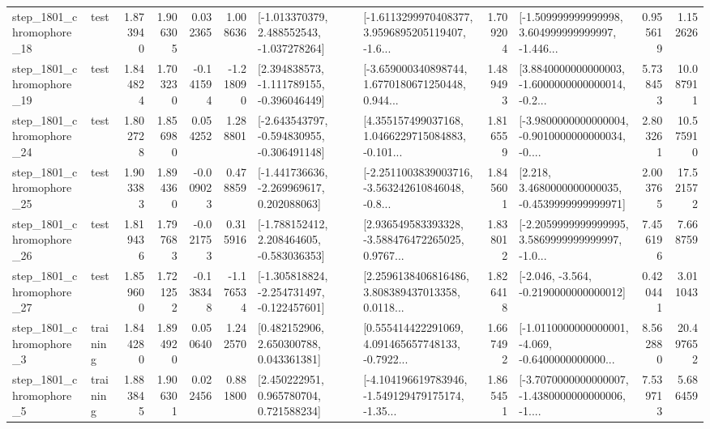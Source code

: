\begin{tabular}{llrrrrllrlrr}
 step\_1801\_chromophore\_18 &      test &      1.873940 &    1.906305 &      0.032365 &  1.008636 &   [-1.013370379, 2.488552543, -1.037278264] &  [-1.6113299970408377, 3.9596895205119407, -1.6... &       1.709204 &  [-1.509999999999998, 3.604999999999997, -1.446... &            0.955619 &          1.152626 \\
 step\_1801\_chromophore\_19 &      test &      1.844824 &    1.703230 &     -0.141594 & -1.218090 &   [2.394838573, -1.111789155, -0.396046449] &  [-3.659000340898744, 1.6770180671250448, 0.944... &       1.489493 &  [3.8840000000000003, -1.6000000000000014, -0.2... &            5.738453 &         10.087911 \\
 step\_1801\_chromophore\_24 &      test &      1.802728 &    1.856980 &      0.054252 &  1.288801 &  [-2.643543797, -0.594830955, -0.306491148] &  [4.355157499037168, 1.0466229715084883, -0.101... &       1.816559 &  [-3.9800000000000004, -0.9010000000000034, -0.... &            2.803261 &         10.575910 \\
 step\_1801\_chromophore\_25 &      test &      1.903383 &    1.894360 &     -0.009023 &  0.478859 &   [-1.441736636, -2.269969617, 0.202088063] &  [-2.2511003839003716, -3.563242610846048, -0.8... &       1.845601 &   [2.218, 3.4680000000000035, -0.4539999999999971] &            2.003765 &         17.521572 \\
 step\_1801\_chromophore\_26 &      test &      1.819436 &    1.797683 &     -0.021753 &  0.315916 &   [-1.788152412, 2.208464605, -0.583036353] &  [2.936549583393328, -3.588476472265025, 0.9767... &       1.838012 &  [-2.2059999999999995, 3.5869999999999997, -1.0... &            7.456196 &          7.668759 \\
 step\_1801\_chromophore\_27 &      test &      1.859600 &    1.721252 &     -0.138348 & -1.176534 &  [-1.305818824, -2.254731497, -0.122457601] &  [2.2596138406816486, 3.808389437013358, 0.0118... &       1.826418 &              [-2.046, -3.564, -0.2190000000000012] &            0.420441 &          3.011043 \\
  step\_1801\_chromophore\_3 &  training &      1.844280 &    1.894920 &      0.050640 &  1.242570 &     [0.482152906, 2.650300788, 0.043361381] &  [0.555414422291069, 4.091465657748133, -0.7922... &       1.667492 &  [-1.0110000000000001, -4.069, -0.6400000000000... &            8.562880 &         20.497652 \\
  step\_1801\_chromophore\_5 &  training &      1.883845 &    1.906301 &      0.022456 &  0.881800 &     [2.450222951, 0.965780704, 0.721588234] &  [-4.104196619783946, -1.549129479175174, -1.35... &       1.865451 &  [-3.7070000000000007, -1.4380000000000006, -1.... &            7.539713 &          5.686459 \\

\end{tabular}
